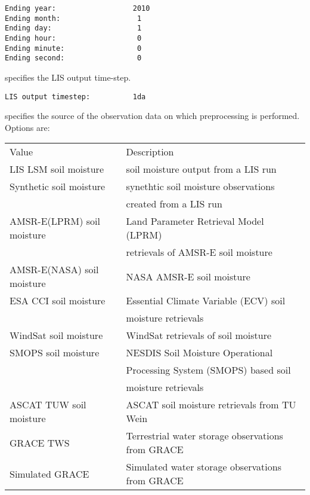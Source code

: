  \begin{Verbatim}[frame=single]
Ending year:                  2010
Ending month:                  1
Ending day:                    1
Ending hour:                   0
Ending minute:                 0
Ending second:                 0
 \end{Verbatim}

 
  specifies the LIS output time-step.
 

 \begin{Verbatim}[frame=single]
LIS output timestep:          1da
 \end{Verbatim}

 
 specifies the source of the observation data on which preprocessing is
 performed.  Options are:

 \begin{tabular}{ll}
 Value                      & Description                           \\
 LIS LSM soil moisture      & soil moisture output from a LIS run   \\
 Synthetic soil moisture    & synethtic soil moisture observations  \\
                            & created from a LIS run                \\
 AMSR-E(LPRM) soil moisture & Land Parameter Retrieval Model (LPRM) \\
                            & retrievals of AMSR-E soil moisture    \\
 AMSR-E(NASA) soil moisture & NASA AMSR-E soil moisture             \\
 ESA CCI soil moisture      & Essential Climate Variable (ECV) soil \\
                            & moisture retrievals                   \\
 WindSat soil moisture      & WindSat retrievals of soil moisture   \\
 SMOPS soil moisture        & NESDIS Soil Moisture Operational   \\
                            & Processing System (SMOPS) based soil  \\
                            & moisture retrievals                   \\
 ASCAT TUW soil moisture    & ASCAT soil moisture retrievals from
                              TU Wein                               \\
 GRACE TWS                  & Terrestrial water storage observations
                              from GRACE                            \\ 
 Simulated GRACE            & Simulated water storage observations
                              from GRACE                            \\ 
 \end{tabular} 
 

